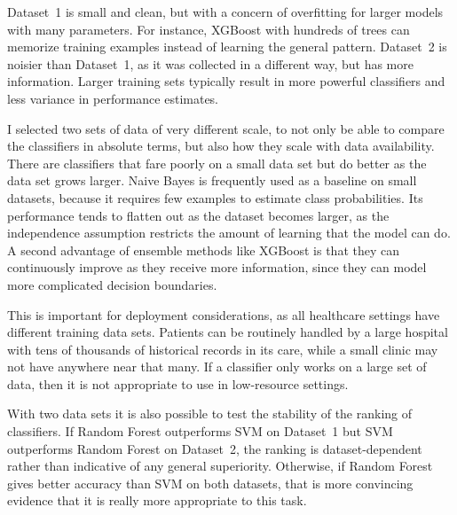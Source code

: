 Dataset~1 is small and clean, but with a concern of overfitting for larger models with many parameters. For instance, XGBoost with hundreds of trees can memorize training examples instead of learning the general pattern. Dataset~2 is noisier than Dataset~1, as it was collected in a different way, but has more information. Larger training sets typically result in more powerful classifiers and less variance in performance estimates.

I selected two sets of data of very different scale, to not only be able to compare the classifiers in absolute terms, but also how they scale with data availability. There are classifiers that fare poorly on a small data set but do better as the data set grows larger. Naive Bayes is frequently used as a baseline on small datasets, because it requires few examples to estimate class probabilities. Its performance tends to flatten out as the dataset becomes larger, as the independence assumption restricts the amount of learning that the model can do. A second advantage of ensemble methods like XGBoost is that they can continuously improve as they receive more information, since they can model more complicated decision boundaries.

This is important for deployment considerations, as all healthcare settings have different training data sets. Patients can be routinely handled by a large hospital with tens of thousands of historical records in its care, while a small clinic may not have anywhere near that many. If a classifier only works on a large set of data, then it is not appropriate to use in low-resource settings.

With two data sets it is also possible to test the stability of the ranking of classifiers. If Random Forest outperforms SVM on Dataset~1 but SVM outperforms Random Forest on Dataset~2, the ranking is dataset-dependent rather than indicative of any general superiority. Otherwise, if Random Forest gives better accuracy than SVM on both datasets, that is more convincing evidence that it is really more appropriate to this task.
